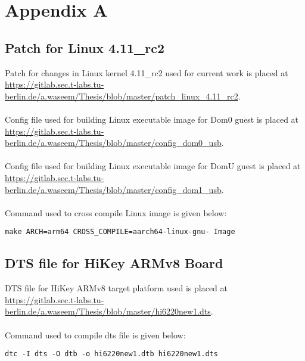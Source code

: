 \appendix

\chapter{Appendix A \label{gitlinux}}
\renewcommand\thesection{\Alph{section}}
\section{Patch for Linux 4.11\_rc2 \label{linux_patch}}
Patch for changes in Linux kernel 4.11\_rc2 used for current work is placed at \\
\url{https://gitlab.sec.t-labs.tu-berlin.de/a.waseem/Thesis/blob/master/patch\_linux_4.11_rc2}.
\\
\\
Config file used for building Linux executable image for Dom0 guest is placed at \\
\url{https://gitlab.sec.t-labs.tu-berlin.de/a.waseem/Thesis/blob/master/config_dom0_usb}.
\\
\\
Config file used for building Linux executable image for DomU guest is placed at \\
\url{https://gitlab.sec.t-labs.tu-berlin.de/a.waseem/Thesis/blob/master/config_dom1_usb}.
\\
\\
Command used to cross compile Linux image is given below:
\begin{lstlisting}[caption=Command to cross compile Linux image for ARMv8 target on x86\_64 host,label={linuxcommand}]
make ARCH=arm64 CROSS_COMPILE=aarch64-linux-gnu- Image
\end{lstlisting}


\section{DTS file for HiKey ARMv8 Board \label{dts}}
DTS file for HiKey ARMv8 target platform used is placed at \\
\url{https://gitlab.sec.t-labs.tu-berlin.de/a.waseem/Thesis/blob/master/hi6220new1.dts}.
\\
\\
Command used to compile dts file is given below:
\begin{lstlisting}[caption=Command to compile dts file into dtb,label={dtscommand}]
dtc -I dts -O dtb -o hi6220new1.dtb hi6220new1.dts
\end{lstlisting}

